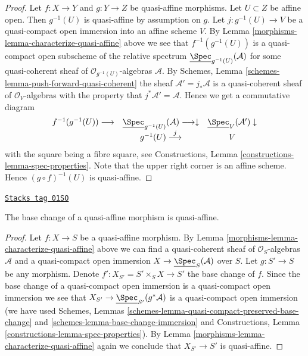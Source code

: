 \begin{proof}

Let $f : X \to Y$ and $g : Y \to Z$ be quasi-affine morphisms.
Let $U \subset Z$ be affine open. Then $g^{-1}(U)$ is quasi-affine
by assumption on $g$. Let $j : g^{-1}(U) \to V$ be a quasi-compact
open immersion into an affine scheme $V$.
By Lemma \ref{morphisms-lemma-characterize-quasi-affine} above
we see that $f^{-1}(g^{-1}(U))$
is a quasi-compact open subscheme of the relative spectrum
$\underline{\Spec}_{g^{-1}(U)}(\mathcal{A})$ for
some quasi-coherent sheaf of $\mathcal{O}_{g^{-1}(U)}$-algebras
$\mathcal{A}$. By
Schemes, Lemma \ref{schemes-lemma-push-forward-quasi-coherent}
the sheaf $\mathcal{A}' = j_*\mathcal{A}$
is a quasi-coherent sheaf of $\mathcal{O}_V$-algebras
with the property that $j^*\mathcal{A}' = \mathcal{A}$.
Hence we get a commutative diagram
$$
\begin{array}{ccc}f^{-1}(g^{-1}(U)) \longrightarrow & \underline{\Spec}_{g^{-1}(U)}(\mathcal{A})
\longrightarrow\downarrow & \underline{\Spec}_V(\mathcal{A}') \downarrow \\  & g^{-1}(U) \overset{j}{\longrightarrow} & V\end{array}
$$
with the square being a fibre square,
see Constructions, Lemma \ref{constructions-lemma-spec-properties}.
Note that the upper right corner is an affine scheme.
Hence $(g \circ f)^{-1}(U)$ is quasi-affine.
\end{proof}

\begin{lemma}
\label{morphisms-lemma-base-change-quasi-affine}
\href{https://stacks.math.columbia.edu/tag/01SO}{\texttt{Stacks tag 01SO}}

The base change of a quasi-affine morphism is quasi-affine.
\end{lemma}

\begin{proof}

Let $f : X \to S$ be a quasi-affine morphism.
By Lemma \ref{morphisms-lemma-characterize-quasi-affine} above
we can find a quasi-coherent sheaf
of $\mathcal{O}_S$-algebras $\mathcal{A}$ and a quasi-compact
open immersion $X \to \underline{\Spec}_S(\mathcal{A})$
over $S$.
Let $g : S' \to S$ be any morphism.
Denote $f' : X_{S'} = S' \times_S X \to S'$ the base change of $f$.
Since the base change of a quasi-compact open immersion is
a quasi-compact open immersion we see that
$X_{S'} \to \underline{\Spec}_{S'}(g^*\mathcal{A})$
is a quasi-compact open immersion
(we have used Schemes, Lemmas
\ref{schemes-lemma-quasi-compact-preserved-base-change} and
\ref{schemes-lemma-base-change-immersion} and
Constructions, Lemma \ref{constructions-lemma-spec-properties}).
By Lemma \ref{morphisms-lemma-characterize-quasi-affine} again
we conclude that $X_{S'} \to S'$ is quasi-affine.
\end{proof}

